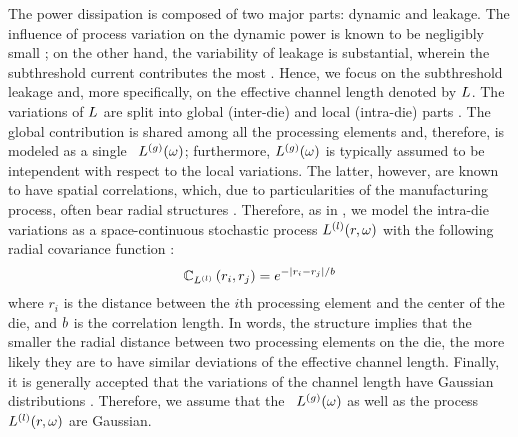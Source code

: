 The power dissipation is composed of two major parts: dynamic and leakage. The influence of process variation on the dynamic power is known to be negligibly small \cite{juan2011, juan2012, srivastava2010}; on the other hand, the variability of leakage is substantial, wherein the subthreshold current contributes the most \cite{juan2011, juan2012}. Hence, we focus on the subthreshold leakage and, more specifically, on the effective channel length denoted by $L$. The variations of $L$ are split into global (inter-die) and local (intra-die) parts \cite{chandra2010, juan2011, juan2012, srivastava2010, shen2009}. The global contribution is shared among all the processing elements and, therefore, is modeled as a single \rv\ ${L^{(g)}}(\omega)$; furthermore, ${L^{(g)}}(\omega)$ is typically assumed to be intependent with respect to the local variations. The latter, however, are known to have spatial correlations, which, due to particularities of the manufacturing process, often bear radial structures \cite{friedberg2005, cheng2011}. Therefore, as in \cite{ghanta2006}, we model the intra-die variations as a space-continuous stochastic process $L^{(l)}(r, \omega)$ with the following radial covariance function \cite{ghanem1991}:
\begin{equation} \elabel{covariance-function}
  \fCov{\lLeff}{r_i, r_j} = e^{-|r_i - r_j|/\corrLength}
\end{equation}
where $r_i$ is the distance between the $i$th processing element and the center of the die, and $b$ is the correlation length. In words, the structure implies that the smaller the radial distance between two processing elements on the die, the more likely they are to have similar deviations of the effective channel length. Finally, it is generally accepted that the variations of the channel length have Gaussian distributions \cite{juan2011, juan2012, srivastava2010}. Therefore, we assume that the \rv\ ${L^{(g)}}(\omega)$ as well as the process $L^{(l)}(r, \omega)$ are Gaussian.

%

